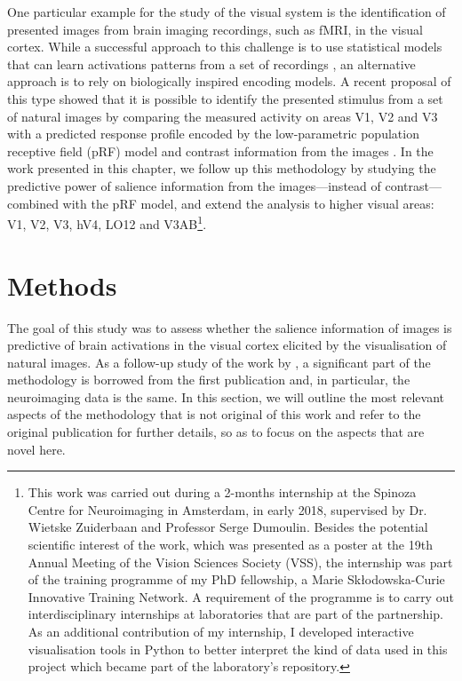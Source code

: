 {One particular example for the study of the visual system is the identification of presented images from brain imaging recordings, such as fMRI, in the visual cortex. While a successful approach to this challenge is to use statistical models that can learn activations patterns from a set of recordings \citep{kay2008imageid}, an alternative approach is to rely on biologically inspired encoding models. A recent proposal of this type showed that it is possible to identify the presented stimulus from a set of natural images by comparing the measured activity on areas V1, V2 and V3 with a predicted response profile encoded by the low-parametric population receptive field (pRF) model and contrast information from the images \citep{zuiderbaan2017imageidentification}. In the work presented in this chapter, we follow up this methodology by studying the predictive power of salience information from the images---instead of contrast---combined with the pRF model, and extend the analysis to higher visual areas: V1, V2, V3, hV4, LO12 and V3AB\footnote{This work was carried out during a 2-months internship at the Spinoza Centre for Neuroimaging in Amsterdam, in early 2018, supervised by Dr. Wietske Zuiderbaan and Professor Serge Dumoulin. Besides the potential scientific interest of the work, which was presented as a poster at the 19th Annual Meeting of the Vision Sciences Society (VSS), the internship was part of the training programme of my PhD fellowship, a Marie Skłodowska-Curie Innovative Training Network. A requirement of the programme is to carry out interdisciplinary internships at laboratories that are part of the partnership. As an additional contribution of my internship, I developed interactive visualisation tools in Python to better interpret the kind of data used in this project which became part of the laboratory's repository.}.

\section{Methods}
\label{sec:imageid-methods}
The goal of this study was to assess whether the salience information of images is predictive of brain activations in the visual cortex elicited by the visualisation of natural images. As a follow-up study of the work by \citet{zuiderbaan2017imageidentification}, a significant part of the methodology is borrowed from the first publication and, in particular, the neuroimaging data is the same. In this section, we will outline the most relevant aspects of the methodology that is not original of this work and refer to the original publication for further details, so as to focus on the aspects that are novel here.

}

